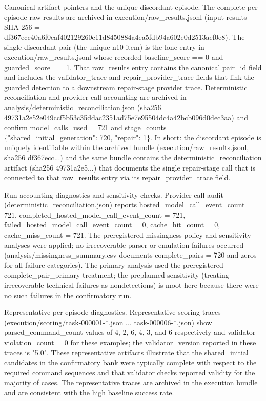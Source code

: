 \documentclass[conference]{IEEEtran}
\begin{document}
Canonical artifact pointers and the unique discordant episode. The complete per-episode raw results are archived in execution/raw\_results.jsonl (input-results SHA-256 = df367ecc\allowbreak{}40a6f0ea\allowbreak{}f4021292\allowbreak{}60e11d84\allowbreak{}50884a4e\allowbreak{}a5fdb94a\allowbreak{}602e0d25\allowbreak{}13aef0e8). The single discordant pair (the unique n10 item) is the lone entry in execution/raw\_results.jsonl whose recorded baseline\_score == 0 and guarded\_score == 1. That raw\_results entry contains the canonical pair\_id field and includes the validator\_trace and repair\_provider\_trace fields that link the guarded detection to a downstream repair-stage provider trace. Deterministic reconciliation and provider-call accounting are archived in analysis/deterministic\_reconciliation.json (sha256 49731a2e\allowbreak{}52e049cc\allowbreak{}f5b53c35\allowbreak{}ddac2351\allowbreak{}ad75e7e9\allowbreak{}5504dc4a\allowbreak{}42bcb096\allowbreak{}d0dec3aa) and confirm model\_calls\_used = 721 and stage\_counts = \{"shared\_initial\_generation": 720, "repair": 1\}. In short: the discordant episode is uniquely identifiable within the archived bundle (execution/raw\_results.jsonl, sha256 df367ecc...) and the same bundle contains the deterministic\_reconciliation artifact (sha256 49731a2e5...) that documents the single repair-stage call that is connected to that raw\_results entry via its repair\_provider\_trace field.

Run-accounting diagnostics and sensitivity checks. Provider-call audit (deterministic\_reconciliation.json) reports hosted\_model\_call\_event\_count = 721, completed\_hosted\_model\_call\_event\_count = 721, failed\_hosted\_model\_call\_event\_count = 0, cache\_hit\_count = 0, cache\_miss\_count = 721. The preregistered missingness policy and sensitivity analyses were applied; no irrecoverable parser or emulation failures occurred (analysis/missingness\_summary.csv documents complete\_pairs = 720 and zeros for all failure categories). The primary analysis used the preregistered complete\_pair\_primary treatment; the preplanned sensitivity (treating irrecoverable technical failures as nondetections) is moot here because there were no such failures in the confirmatory run.

Representative per-episode diagnostics. Representative scoring traces (execution/scoring/task-000001-*.json ... task-000006-*.json) show parsed\_command\_count values of 4, 2, 6, 4, 3, and 6 respectively and validator violation\_count = 0 for these examples; the validator\_version reported in these traces is "5.0". These representative artifacts illustrate that the shared\_initial candidates in the confirmatory bank were typically complete with respect to the required command sequences and that validator checks reported validity for the majority of cases. The representative traces are archived in the execution bundle and are consistent with the high baseline success rate.
\end{document}
